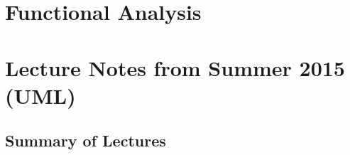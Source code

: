 \documentclass[crop=false,class=article,oneside]{standalone}
\begin{document}
    \ifx\ifmathcoursesfunctional\undefined
        \section*{Functional Analysis}
        \setcounter{section}{1}
        \renewcommand\thefigure{\arabic{section}.\arabic{figure}}
        \renewcommand\thesubfigure{%
            \arabic{section}.\arabic{figure}.\arabic{subfigure}}
    \else
        \section{Lecture Notes from Summer 2015 (UML)}
    \fi
    \subsection{Summary of Lectures}
\end{document}
